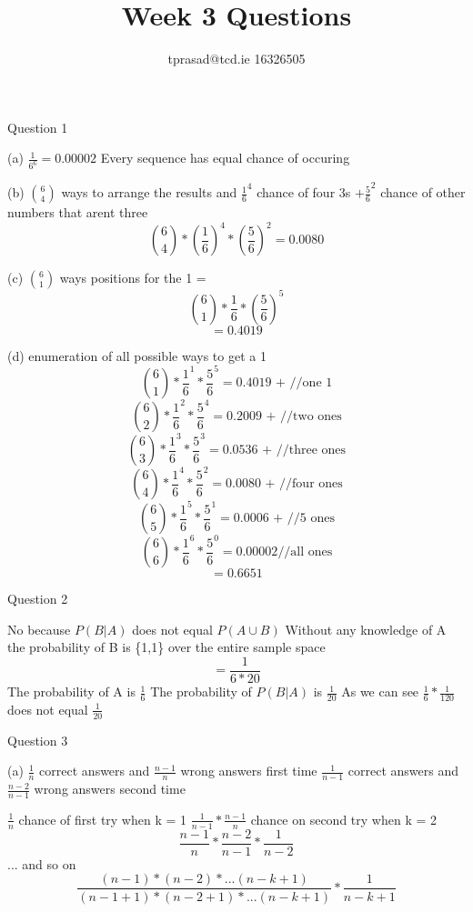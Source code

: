 \documentclass[12pt]{article}
\title{Week 3 Questions}
\author{tprasad@tcd.ie 16326505}
\begin{document}
\maketitle
\begin{flushleft}
Question 1

	(a)	$\frac{1}{6^6} = 0.00002$ Every sequence has equal chance of occuring
	
	(b) $\binom{6}{4}$ ways to arrange the results and $\frac{1}{6}^4 $ chance of four 3s $+ \frac{5}{6}^2 $ chance of other numbers that arent three
		\[ \binom{6}{4}*\left(\frac{1}{6}\right)^4*\left(\frac{5}{6}\right) ^2= 0.0080 \]
		
	(c) $\binom{6}{1}$ ways positions for the 1 = 
	\[\binom{6}{1}*\frac{1}{6}*\left(\frac{5}{6}\right)^5 \]
		\[= 0.4019\]	
		
	(d) enumeration of all possible ways to get a 1
		\[ \binom{6}{1}*\frac{1}{6}^1*\frac{5}{6}^5 = 0.4019 \text{ + //one 1} \]
		\[\binom{6}{2}*\frac{1}{6}^2*\frac{5}{6}^4 = 0.2009 \text{ +  //two ones} \]
		\[\binom{6}{3}*\frac{1}{6}^3*\frac{5}{6}^3 = 0.0536 \text{ +  //three ones} \]
		\[\binom{6}{4}*\frac{1}{6}^4*\frac{5}{6}^2 = 0.0080 \text{ + //four ones} \]
		\[\binom{6}{5}*\frac{1}{6}^5*\frac{5}{6}^1 = 0.0006 \text{ + //5 ones} \]
		\[\binom{6}{6}*\frac{1}{6}^6*\frac{5}{6}^0 = 0.00002    \text{//all ones} \]
		\[ = 0.6651 \]
		
Question 2

	No because $P(B \vert A)$ does not equal $P(A \cup B)$ \newline
	Without any knowledge of  A the probability of B is \{1,1\} over the entire sample space 
	\[ = \frac{1}{6*20} \]
	The probability of A is $\frac{1}{6}$ \newline
	The probability of $P(B \vert A)$ is $\frac{1}{20}$ \newline
	As we can see $\frac{1}{6}*\frac{1}{120}$ does not equal $\frac{1}{20}$
	
Question 3

	(a)
	$\frac{1}{n}$ correct answers and $\frac{n-1}{n}$ wrong answers first time \newline
	$\frac{1}{n-1}$ correct answers and $\frac{n-2}{n-1}$ wrong answers second time
	
	$\frac{1}{n}$ chance of first try when k = 1 \newline
	$\frac{1}{n-1}*\frac{n-1}{n}$ chance on second try when k = 2 \newline
	\[\frac{n-1}{n}*\frac{n-2}{n-1}*\frac{1}{n-2}\]
	...  and so on \newline
	\[\frac{(n-1)*(n-2)*...(n-k+1)}{(n-1+1)*(n-2+1)*...(n-k+1)}*\frac{1}{n-k+1}\]
	

\end{flushleft}
\end{document}
